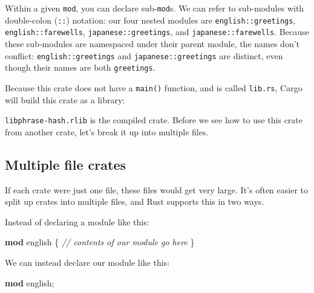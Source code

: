 \documentclass[a4paper,]{book}
\newenvironment{Shaded}{\begin{snugshade}}{\end{snugshade}}
\newcommand{\KeywordTok}[1]{\textcolor[rgb]{0.13,0.29,0.53}{\textbf{{#1}}}}
\newcommand{\CommentTok}[1]{\textcolor[rgb]{0.56,0.35,0.01}{\textit{{#1}}}}
\newcommand{\NormalTok}[1]{{#1}}
\begin{document}
Within a given \texttt{mod}, you can declare sub-\texttt{mod}s. We can
refer to sub-modules with double-colon (\texttt{::}) notation: our four
nested modules are \texttt{english::greetings},
\texttt{english::farewells}, \texttt{japanese::greetings}, and
\texttt{japanese::farewells}. Because these sub-modules are namespaced
under their parent module, the names don't conflict:
\texttt{english::greetings} and \texttt{japanese::greetings} are
distinct, even though their names are both \texttt{greetings}.

Because this crate does not have a \texttt{main()} function, and is
called \texttt{lib.rs}, Cargo will build this crate as a library:

\begin{Shaded}
\end{Shaded}

\texttt{libphrase-hash.rlib} is the compiled crate. Before we see how to
use this crate from another crate, let's break it up into multiple
files.

\subsection{Multiple file crates}\label{multiple-file-crates}

If each crate were just one file, these files would get very large. It's
often easier to split up crates into multiple files, and Rust supports
this in two ways.

Instead of declaring a module like this:

\begin{Shaded}
\begin{Highlighting}[]
\KeywordTok{mod} \NormalTok{english \{}
    \CommentTok{// contents of our module go here}
\NormalTok{\}}
\end{Highlighting}
\end{Shaded}

We can instead declare our module like this:

\begin{Shaded}
\begin{Highlighting}[]
\KeywordTok{mod} \NormalTok{english;}
\end{Highlighting}
\end{Shaded}
\end{document}

